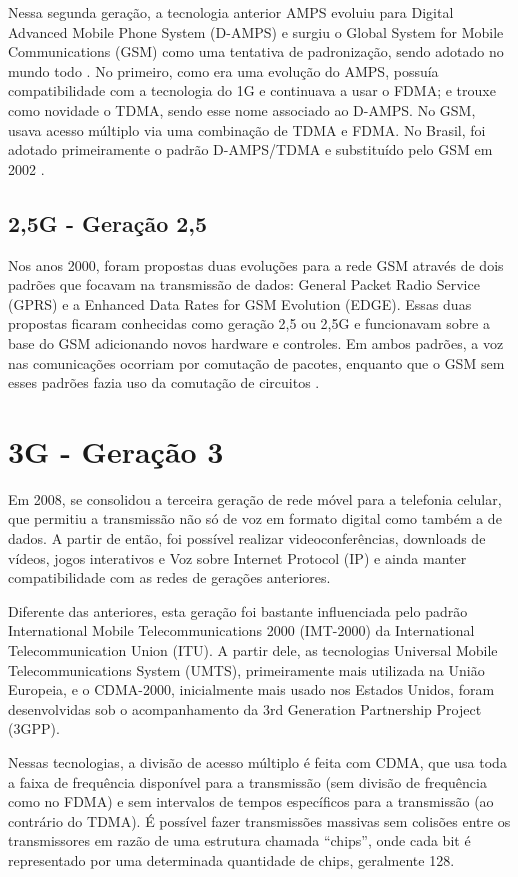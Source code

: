 \documentclass[11pt,oneside,a4paper]{abntex2}
\begin{document}
Nessa segunda geração, a tecnologia anterior AMPS evoluiu para Digital Advanced Mobile Phone System (D-AMPS) e surgiu o Global System for Mobile Communications (GSM) como uma tentativa de padronização, sendo adotado no mundo todo \cite{aula3}. No primeiro, como era uma evolução do AMPS, possuía compatibilidade com a tecnologia do 1G e continuava a usar o FDMA; e trouxe como novidade o TDMA, sendo esse nome associado ao D-AMPS. No GSM, usava acesso múltiplo via uma combinação de TDMA e FDMA. No Brasil, foi adotado primeiramente o padrão D-AMPS/TDMA e substituído pelo GSM em 2002 \cite{tcc2}.

\subsection*{2,5G - Geração 2,5}

Nos anos 2000, foram propostas duas evoluções para a rede GSM através de dois padrões que focavam na transmissão de dados: General Packet Radio Service (GPRS) e a Enhanced Data Rates for GSM Evolution (EDGE). Essas duas propostas ficaram conhecidas como geração 2,5 ou 2,5G e funcionavam sobre a base do GSM adicionando novos hardware e controles. Em ambos padrões, a voz nas comunicações ocorriam por comutação de pacotes, enquanto que o GSM sem esses padrões fazia uso da comutação de circuitos \cite{tcc2}.

\section*{3G - Geração 3}
\label{3g}

Em 2008, se consolidou a terceira geração de rede móvel para a telefonia celular, que permitiu a transmissão não só de voz em formato digital como também a de dados. A partir de então, foi possível realizar videoconferências, downloads de vídeos, jogos interativos e Voz sobre Internet Protocol (IP) \cite{tcc1} e ainda manter compatibilidade com as redes de gerações anteriores.

Diferente das anteriores, esta geração foi bastante influenciada pelo padrão International Mobile Telecommunications 2000 (IMT-2000) da International Telecommunication Union (ITU). A partir dele, as tecnologias Universal Mobile Telecommunications System (UMTS), primeiramente mais utilizada na União Europeia, e o CDMA-2000, inicialmente mais usado nos Estados Unidos, foram desenvolvidas sob o acompanhamento da 3rd Generation Partnership Project (3GPP).

Nessas tecnologias, a divisão de acesso múltiplo é feita com CDMA, que usa toda a faixa de frequência disponível para a transmissão (sem divisão de frequência como no FDMA) e sem intervalos de tempos específicos para a transmissão (ao contrário do TDMA). É possível fazer transmissões massivas sem colisões entre os transmissores em razão de  uma estrutura chamada ``chips'', onde cada bit é representado por uma determinada quantidade de chips, geralmente 128.
\end{document}
